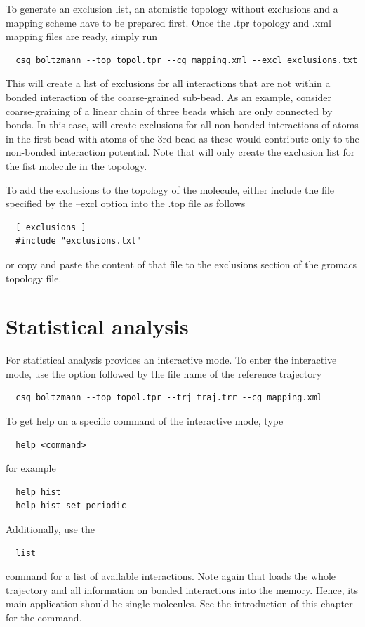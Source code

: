 To generate an exclusion list, an atomistic topology without exclusions and a mapping scheme have to be prepared first. Once the .tpr topology and .xml mapping files are ready, simply run
\begin{verbatim}
  csg_boltzmann --top topol.tpr --cg mapping.xml --excl exclusions.txt
\end{verbatim}
This will create a list of exclusions for all interactions that are not within a bonded interaction of the coarse-grained sub-bead. As an example, consider coarse-graining of a linear chain of three beads  which are only connected by bonds. In this case,  will create exclusions for all non-bonded interactions of atoms in the first bead with atoms of the 3rd bead as these would contribute only to the non-bonded interaction potential. Note that  will only create the exclusion list for the fist molecule in the topology.

To add the exclusions to the \gromacs topology of the molecule, either include the file specified by the --excl option into the .top file as follows
\begin{verbatim}
  [ exclusions ]
  #include "exclusions.txt"
\end{verbatim}
or copy and paste the content of that file to the exclusions section of the gromacs topology file.

\section{Statistical analysis}
For statistical analysis  provides an interactive mode. To enter the interactive mode, use the  option followed by the file name of the reference trajectory 
\begin{verbatim}
  csg_boltzmann --top topol.tpr --trj traj.trr --cg mapping.xml
\end{verbatim}
%
To get help on a specific command of the interactive mode, type
\begin{verbatim}
  help <command>
\end{verbatim}
for example
\begin{verbatim}
  help hist
  help hist set periodic
\end{verbatim}
%
Additionally, use the
\begin{verbatim}
  list
\end{verbatim}
command for a list of available interactions. Note again that  loads the whole trajectory and all information on bonded interactions into the memory. Hence, its main application should be single molecules. See the introduction of this chapter for the  command.

